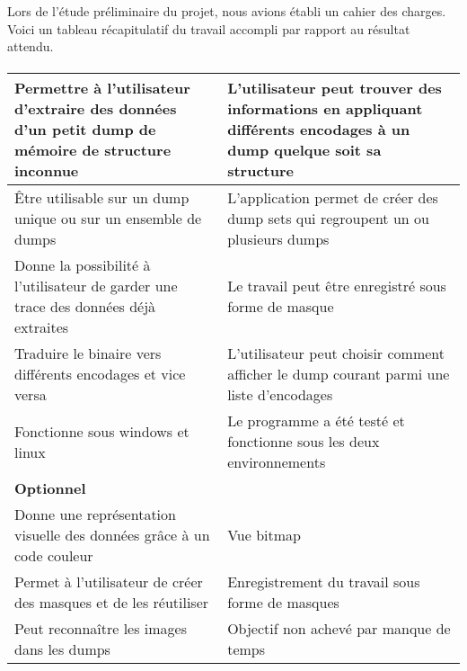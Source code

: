 Lors de l'étude préliminaire du projet, nous avions établi un cahier des charges. Voici un tableau récapitulatif du travail accompli par rapport au résultat attendu.
\paragraph{}

\begin{tabular}{|p{6cm}|p{6cm}|}
  \hline
  Permettre à l'utilisateur d'extraire des données d'un petit dump de mémoire de structure inconnue &
  L'utilisateur peut trouver des informations en appliquant différents encodages à un dump quelque soit sa structure
  \\ \hline
  Être utilisable sur un dump unique ou sur un ensemble de dumps &
  L'application permet de créer des dump sets qui regroupent un ou plusieurs dumps
  \\ \hline
  Donne la possibilité à l'utilisateur de garder une trace des données déjà extraites &
  Le travail peut être enregistré sous forme de masque
  \\ \hline
  Traduire le binaire vers différents encodages et vice versa &
  L'utilisateur peut choisir comment afficher le dump courant parmi une liste d'encodages
  \\ \hline
  Fonctionne sous windows et linux &
  Le programme a été testé et fonctionne sous les deux environnements
  \\ \hline \hline
  \textbf{Optionnel} &
  \\ \hline
  Donne une représentation visuelle des données grâce à un code couleur &
  Vue bitmap
  \\ \hline
  Permet à l'utilisateur de créer des masques et de les réutiliser &
  Enregistrement du travail sous forme de masques
  \\ \hline
  Peut reconnaître les images dans les dumps &
  Objectif non achevé par manque de temps
  \\ \hline
\end{tabular}
